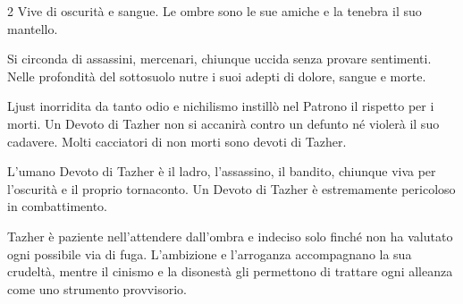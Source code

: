 \begin{multicols}{2}
Vive di oscurità e sangue. Le ombre sono le sue amiche e la tenebra il suo mantello.

Si circonda di assassini, mercenari, chiunque uccida senza provare sentimenti. Nelle profondità del sottosuolo nutre i suoi adepti di dolore, sangue e morte.

Ljust inorridita da tanto odio e nichilismo instillò nel Patrono il rispetto per i morti. Un Devoto di Tazher non si accanirà contro un defunto né violerà il suo cadavere. Molti cacciatori di non morti sono devoti di Tazher.

L'umano Devoto di Tazher è il ladro, l'assassino, il bandito, chiunque viva per l'oscurità e il proprio tornaconto. Un Devoto di Tazher è estremamente pericoloso in combattimento.

Tazher è paziente nell'attendere dall'ombra e indeciso solo finché non ha valutato ogni possibile via di fuga. L'ambizione e l'arroganza accompagnano la sua crudeltà, mentre il cinismo e la disonestà gli permettono di trattare ogni alleanza come uno strumento provvisorio.


\end{multicols}
